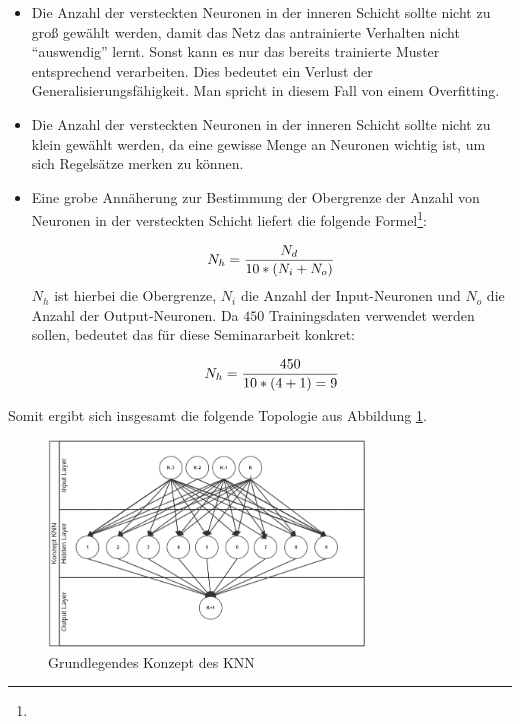 \begin{itemize}
\item Die Anzahl der versteckten Neuronen in der inneren Schicht sollte nicht zu groß gewählt werden, damit das Netz das antrainierte Verhalten nicht "`auswendig"' lernt. Sonst kann es nur das bereits trainierte Muster entsprechend verarbeiten. Dies bedeutet ein Verlust der Generalisierungsfähigkeit. Man spricht in diesem Fall von einem Overfitting.

\item Die Anzahl der versteckten Neuronen in der inneren Schicht sollte nicht zu klein gewählt werden, da eine gewisse Menge an Neuronen wichtig ist, um sich Regelsätze merken zu können.

\item Eine grobe Annäherung zur Bestimmung der Obergrenze der Anzahl von Neuronen in der versteckten Schicht liefert die folgende Formel\footnote{\Vgl{}}:

\begin{equation}\formelentry{Optimale Anzahl Neuronen in der versteckten Schicht}
  N_h = \frac{N_d}{10*(N_i+N_o)}
\end{equation}
$N_h$ ist hierbei die Obergrenze, $N_i$ die Anzahl der Input-Neuronen und $N_o$ die Anzahl der Output-Neuronen. Da $450$ Trainingsdaten verwendet werden sollen, bedeutet das für diese Seminararbeit konkret:

\begin{equation}\formelentry{Optimale Anzahl Neuronen in der versteckten Schicht}
  N_h = \frac{450}{10*(4+1) = 9 }   
\end{equation}
\end{itemize}
 
Somit ergibt sich insgesamt die folgende Topologie aus Abbildung \ref{fig:Grundlegende Topologie des KNN}. 

\begin{figure}[H]
\centering
		\includegraphics[width=0.75\textwidth]{KonzKNN.PNG}
	\caption{Grundlegendes Konzept des KNN}
	\label{fig:Grundlegende Topologie des KNN}
\end{figure}

